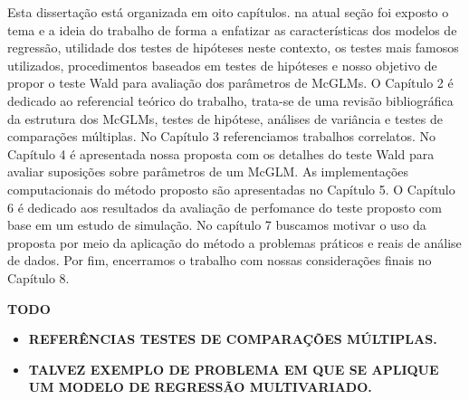 Esta dissertação está organizada em oito capítulos. na atual seção foi exposto o tema e a ideia do trabalho de forma a enfatizar as características dos modelos de regressão, utilidade dos testes de hipóteses neste contexto, os testes mais famosos utilizados, procedimentos baseados em testes de hipóteses e nosso objetivo de propor o teste Wald para avaliação dos parâmetros de McGLMs. O Capítulo 2 é dedicado ao referencial teórico do trabalho, trata-se de uma revisão bibliográfica da estrutura dos McGLMs, testes de hipótese, análises de variância e testes de comparações múltiplas. No Capítulo 3 referenciamos trabalhos correlatos. No Capítulo 4 é apresentada nossa proposta com os detalhes do teste Wald para avaliar suposições sobre parâmetros de um McGLM. As implementações computacionais do método proposto são apresentadas no Capítulo 5. O Capítulo 6 é dedicado aos resultados da avaliação de perfomance do teste proposto com base em um estudo de simulação. No capítulo 7 buscamos motivar o uso da proposta por meio da aplicação do método a problemas práticos e reais de análise de dados. Por fim, encerramos o trabalho com nossas considerações finais no Capítulo 8.


\vspace{2cm}

\textbf{TODO}
  
\begin{itemize}
  
  \item \textbf{REFERÊNCIAS TESTES DE COMPARAÇÕES MÚLTIPLAS.}
    
  \item \textbf{TALVEZ EXEMPLO DE PROBLEMA EM QUE SE APLIQUE UM MODELO DE REGRESSÃO MULTIVARIADO.}
  
\end{itemize}


